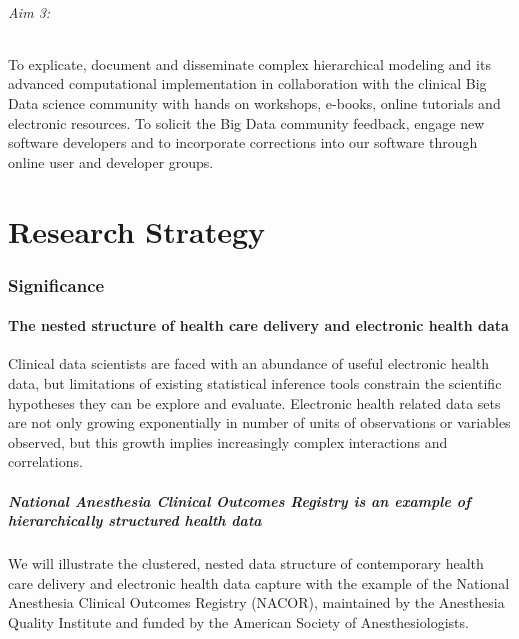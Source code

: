 \documentclass[11pt,notitlepage]{article}
\begin{document}
\paragraph*{Aim 3:} To explicate, document and disseminate complex hierarchical modeling and its advanced computational implementation in collaboration with the clinical Big Data science community with hands on workshops, e-books, online tutorials and electronic resources. To solicit the Big Data community feedback, engage new software developers and to incorporate corrections into our software through online user and developer groups.

\part*{Research Strategy}

\section*{Significance}

\subsection*{The nested structure of health care delivery and electronic health data}
Clinical data scientists are faced with an abundance of useful electronic health data, but limitations of existing statistical inference tools constrain the scientific hypotheses they can be explore and evaluate. Electronic health related data sets are not only growing exponentially in number of units of observations or variables observed, but this growth implies increasingly complex interactions and correlations. 

\subsubsection*{National Anesthesia Clinical Outcomes Registry is an example of hierarchically structured health data}
We will illustrate the clustered, nested data structure of contemporary health care delivery and electronic health data capture with the example of the National Anesthesia Clinical Outcomes Registry (NACOR), maintained by the Anesthesia Quality Institute and funded by the American Society of Anesthesiologists. 
\end{document}
